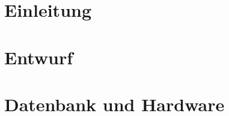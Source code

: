 \documentclass{scrartcl}
\date{}
\begin{document}
\maketitle
\tableofcontents
\renewcommand{\maketitle}{}
\renewcommand{\tableofcontents}{}

\section{Einleitung}


\clearpage


\clearpage


\clearpage
\section{Entwurf}


\clearpage
\section{Datenbank und Hardware}

\end{document}
